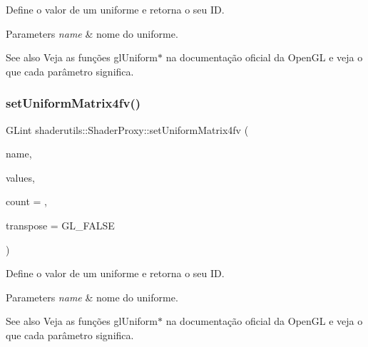Define o valor de um uniforme e retorna o seu ID. 
\begin{DoxyParams}{Parameters}
{\em name} & nome do uniforme. \\
\hline
\end{DoxyParams}
\begin{DoxySeeAlso}{See also}
Veja as funções gl\+Uniform$\ast$ na documentação oficial da Open\+GL e veja o que cada parâmetro significa. 
\end{DoxySeeAlso}
\mbox{\label{classshaderutils_1_1_shader_proxy_a1e06ec7d1d9818ebedbd938e055c2dc6}} 
\subsubsection{\texorpdfstring{set\+Uniform\+Matrix4fv()}{setUniformMatrix4fv()}}
{\footnotesize\ttfamily G\+Lint shaderutils\+::\+Shader\+Proxy\+::set\+Uniform\+Matrix4fv (\begin{DoxyParamCaption}\item[{const char $\ast$}]{name,  }\item[{const G\+Lfloat $\ast$}]{values,  }\item[{G\+Luint}]{count = {},  }\item[{G\+Lboolean}]{transpose = {\ttfamily GL\+\_\+FALSE} }\end{DoxyParamCaption})\hspace{0.3cm}{\ttfamily [inline]}}

Define o valor de um uniforme e retorna o seu ID. 
\begin{DoxyParams}{Parameters}
{\em name} & nome do uniforme. \\
\hline
\end{DoxyParams}
\begin{DoxySeeAlso}{See also}
Veja as funções gl\+Uniform$\ast$ na documentação oficial da Open\+GL e veja o que cada parâmetro significa. 
\end{DoxySeeAlso}
\mbox{\label{classshaderutils_1_1_shader_proxy_ac2b05aa33061973230adcb49191662d7}} 
